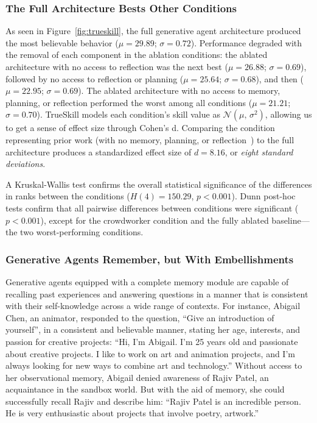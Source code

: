 \subsubsection{The Full Architecture Bests Other Conditions} As seen in Figure~\ref{fig:trueskill}, the full generative agent architecture produced the most believable behavior ($\mu=29.89$; $\sigma=0.72$). Performance degraded with the removal of each component in the ablation conditions: the ablated architecture with no access to reflection was the next best ($\mu=26.88$; $\sigma=0.69$), followed by no access to reflection or planning ($\mu=25.64$; $\sigma=0.68$), and then {\color{black}{the crowdworker condition}} ($\mu=22.95$; $\sigma=0.69$). The ablated architecture with no access to memory, planning, or reflection performed the worst among all conditions ($\mu=21.21$; $\sigma=0.70$). TrueSkill models each condition's skill value as $\mathcal{N}(\mu,\,\sigma^{2})$, allowing us to get a sense of effect size through Cohen's d. Comparing the condition representing prior work (with no memory, planning, or reflection~\cite{9_park2022socialsimulacra,binz2023using,63_horton2023large}) to the full architecture produces a standardized effect size of $d=8.16$, or \textit{eight standard deviations}. 

A Kruskal-Wallis test confirms the overall statistical significance of the differences in ranks between the conditions ($H(4)=150.29$, $p<0.001$). Dunn post-hoc tests confirm that all pairwise differences between conditions were significant ($p<0.001$), except for the crowdworker condition and the fully ablated baseline---the two worst-performing conditions.

\subsubsection{Generative Agents Remember, but With Embellishments} Generative agents equipped with a complete memory module are capable of recalling past experiences and answering questions in a manner that is consistent with their self-knowledge across a wide range of contexts. For instance, Abigail Chen, an animator, responded to the question, ``Give an introduction of yourself'', in a consistent and believable manner, stating her age, interests, and passion for creative projects: {\color{darkgray}\small\fontfamily{}\selectfont
``Hi, I'm Abigail. I'm 25 years old and passionate about creative projects. I like to work on art and animation projects, and I'm always looking for new ways to combine art and technology.''} Without access to her observational memory, Abigail denied awareness of Rajiv Patel, an acquaintance in the sandbox world. But with the aid of memory, she could successfully recall Rajiv and describe him: {\color{darkgray}\small\fontfamily{}\selectfont
``Rajiv Patel is an incredible person. He is very enthusiastic about projects that involve poetry, artwork.''}

